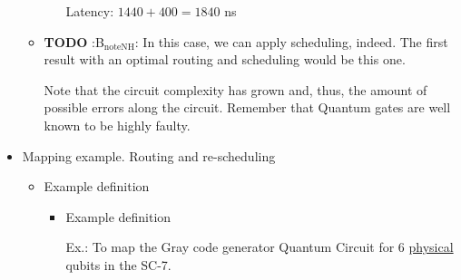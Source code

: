 \begin{itemize}
\begin{itemize}
\begin{itemize}
{
}

Latency: \(1440 + 400 = 1840\) ns
\end{itemize}

\item {\bfseries\sffamily TODO} :B\(_{\text{noteNH}}\):
\label{sec:org1e3e68d}
In this case, we can apply scheduling, indeed. The first result with an optimal routing and scheduling would be this one.

Note that the circuit complexity has grown and, thus, the amount of possible errors along the circuit.
Remember that Quantum gates are well known to be highly faulty.
\end{itemize}

\item Mapping example. Routing and re-scheduling
\label{sec:orgf3feb1d}
\begin{itemize}
\item Example definition
\label{sec:orge1759de}
\begin{itemize}
\item Example definition
\label{sec:org5f0cade}
\begin{center}

Ex.: To map the Gray code generator Quantum Circuit for 6 \uline{physical} qubits in the SC-7.

\end{center}


\end{itemize}
\end{itemize}
\end{itemize}

